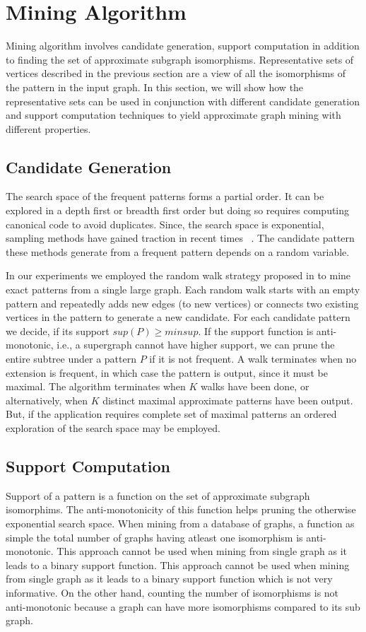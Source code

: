 \section{Mining Algorithm}
 Mining algorithm involves candidate generation, support computation
 in addition to finding the set of approximate subgraph isomorphisms.
 Representative sets of vertices described in the previous section are a view
 of all the isomorphisms of the pattern in the input graph. In this section,
 we will show how the representative sets can be used in conjunction
 with different candidate generation and support computation techniques
 to yield approximate graph mining with different properties.


\subsection{Candidate Generation} 

The search space of the frequent patterns forms a partial order. 
It can be explored in a depth first or
breadth first order but doing so requires computing canonical code to avoid
duplicates. Since, the search space is exponential, sampling methods
have gained traction in recent times~\cite{2008-origami:sadm,2009-graphsampling}
. The candidate pattern these methods
generate from a frequent pattern depends on a random variable. 


In our experiments we employed the random walk strategy proposed in
\cite{2011-icdm} to mine exact patterns from a single large graph. Each
random walk starts with an empty pattern and repeatedly adds new edges
(to new vertices) or connects two existing vertices in the pattern to
generate a new candidate.  
For each
candidate pattern we decide,  if its support $sup(P) \geq minsup$.
If the support function is anti-monotonic, i.e., a supergraph 
cannot have higher support,
we can prune the entire subtree under a pattern $P$ if it is not
frequent. A walk terminates when no extension is
frequent, in which case the pattern is output, since it must be
maximal. The algorithm terminates when $K$ walks have been done, or
alternatively, when $K$ distinct maximal approximate
patterns have been output. But, if the 
application requires complete set of maximal patterns an ordered exploration
of the search space may be employed.

\subsection{Support Computation}
Support of a pattern is a function on the set of approximate subgraph
isomorphims. The anti-monotonicity of this function helps pruning the
otherwise exponential search space. When mining from a database
of graphs, a function as simple the total number of graphs having
atleast one isomorphism is anti-monotonic. This approach cannot
be used when mining from single graph as it leads to a binary support
function. This approach cannot
be used when mining from single graph as it leads to a binary support
function which is not very informative. On the other hand, counting the
number of isomorphisms is not anti-monotonic because a graph can have
more isomorphisms compared to its sub graph.

